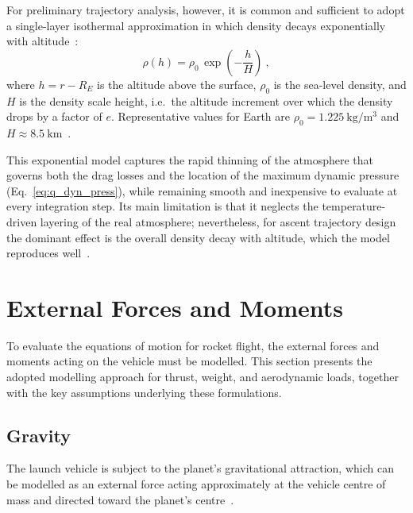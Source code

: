 For preliminary trajectory analysis, however, it is common and sufficient to adopt a single-layer isothermal approximation in which density decays exponentially with altitude~\cite{curtis2020orbital}:
\begin{equation}
\rho(h) = \rho_0\,\exp\!\left(-\frac{h}{H}\right) \ ,
\label{eq:exp_atmosphere}
\end{equation}
where $h = r - R_E$ is the altitude above the surface, $\rho_0$ is the sea-level density, and $H$ is the density scale height, i.e.\ the altitude increment over which the density drops by a factor of $e$. Representative values for Earth are $\rho_0 = 1.225~\mathrm{kg/m^3}$ and $H \approx 8.5~\mathrm{km}$~\cite{curtis2020orbital}.

This exponential model captures the rapid thinning of the atmosphere that governs both the drag losses and the location of the maximum dynamic pressure (Eq.~\eqref{eq:q_dyn_press}), while remaining smooth and inexpensive to evaluate at every integration step. Its main limitation is that it neglects the temperature-driven layering of the real atmosphere; nevertheless, for ascent trajectory design the dominant effect is the overall density decay with altitude, which the model reproduces well~\cite{Ulrich}.


\section{External Forces and Moments}
\label{sec:External_Forces_Moments}

To evaluate the equations of motion for rocket flight, the external forces and moments acting on the vehicle must be modelled. This section presents the adopted modelling approach for thrust, weight, and aerodynamic loads, together with the key assumptions underlying these formulations.


\subsection{Gravity}

The launch vehicle is subject to the planet's gravitational attraction, which can be modelled as an external force acting approximately at the vehicle centre of mass and directed toward the planet's centre~\cite{curtis2020orbital}.

